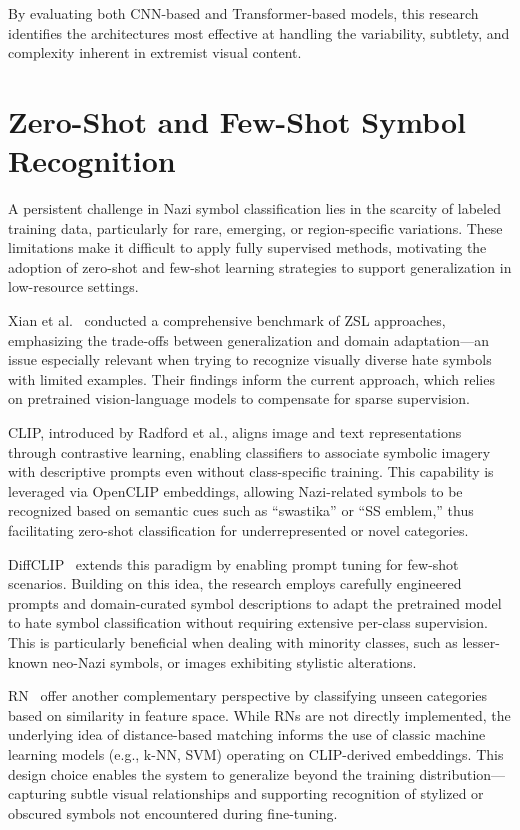 By evaluating both \ac{CNN}-based and Transformer-based models, this research identifies the architectures most
effective
at handling the variability, subtlety, and complexity inherent in extremist visual content.

\section{Zero-Shot and Few-Shot Symbol Recognition}

A persistent challenge in Nazi symbol classification lies in the scarcity of labeled training data, particularly for
rare, emerging, or region-specific variations. These limitations make it difficult to apply fully supervised
methods, motivating the adoption of zero-shot and few-shot learning strategies to support generalization in
low-resource settings.

Xian et al.~\parencite{xian2017zeroshot} conducted a comprehensive benchmark of \ac{ZSL} approaches, emphasizing the
trade-offs between generalization and domain adaptation—an issue especially relevant when trying to recognize
visually diverse hate symbols with limited examples. Their findings inform the current approach, which relies on
pretrained vision-language models to compensate for sparse supervision.

CLIP, introduced by Radford et al.\parencite{radford2021clip}, aligns image and text representations through
contrastive learning\parencite{chen2020simpleframeworkcontrastivelearning}, enabling classifiers to associate
symbolic imagery with descriptive prompts even without class-specific training. This capability is leveraged via
OpenCLIP embeddings, allowing Nazi-related symbols to be recognized based on semantic cues such as “swastika” or “SS
emblem,” thus facilitating zero-shot classification for underrepresented or novel categories.

DiffCLIP~\parencite{zhang2021language} extends this paradigm by enabling prompt tuning for few-shot scenarios.
Building on this idea, the research employs carefully engineered prompts and domain-curated symbol descriptions to
adapt the pretrained model to hate symbol classification without requiring extensive per-class supervision. This is
particularly beneficial when dealing with minority classes, such as lesser-known neo-Nazi symbols, or images
exhibiting stylistic alterations.

\ac{RN}~\parencite{sung2018learning} offer another complementary perspective by classifying unseen
categories based on similarity in feature space. While RNs are not directly implemented, the underlying idea of
distance-based matching informs the use of classic machine learning models (e.g., k-NN, SVM) operating on
CLIP-derived embeddings. This design choice enables the system to generalize beyond the training
distribution—capturing subtle visual relationships and supporting recognition of stylized or obscured symbols not
encountered during fine-tuning.


